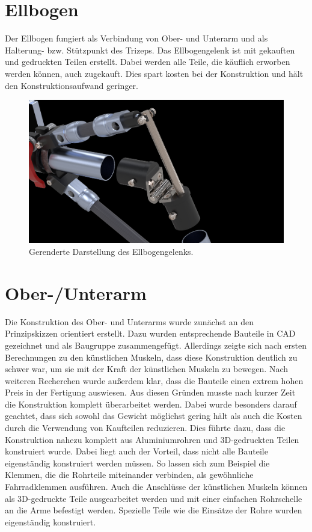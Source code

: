 	\section{Ellbogen}
		Der Ellbogen fungiert als Verbindung von Ober- und Unterarm und als Halterung- bzw. Stützpunkt des Trizeps.
		Das Ellbogengelenk ist mit gekauften und gedruckten Teilen erstellt.
		Dabei werden alle Teile, die käuflich erworben werden können, auch zugekauft.
		Dies spart kosten bei der Konstruktion und hält den Konstruktionsaufwand geringer.
		\begin{figure}[h]
			\centering
			\includegraphics[width=\textwidth]{Abb/CAD/Renderings/ellbogen.jpg}
			\caption[Gerenderte Darstellung des Ellbogengelenks]{Gerenderte Darstellung des Ellbogengelenks.}%
			\label{fig:rendering ellbogen}
		\end{figure}
	
	\section{Ober-/Unterarm}
		Die Konstruktion des Ober- und Unterarms wurde zunächst an den Prinzipskizzen orientiert erstellt.
		Dazu wurden entsprechende Bauteile in CAD gezeichnet und als Baugruppe zusammengefügt.
		Allerdings zeigte sich nach ersten Berechnungen zu den künstlichen Muskeln, dass diese Konstruktion deutlich zu schwer war, um sie mit der Kraft der künstlichen Muskeln zu bewegen.
		Nach weiteren Recherchen wurde außerdem klar, dass die Bauteile einen extrem hohen Preis in der Fertigung auswiesen.
		Aus diesen Gründen musste nach kurzer Zeit die Konstruktion komplett überarbeitet werden.
		Dabei wurde besonders darauf geachtet, dass sich sowohl das Gewicht möglichst gering hält als auch die Kosten durch die Verwendung von Kaufteilen reduzieren.
		Dies führte dazu, dass die Konstruktion nahezu komplett aus Aluminiumrohren und 3D-gedruckten Teilen konstruiert wurde.
		Dabei liegt auch der Vorteil, dass nicht alle Bauteile eigenständig konstruiert werden müssen.
		So lassen sich zum Beispiel die Klemmen, die die Rohrteile miteinander verbinden, als gewöhnliche Fahrradklemmen ausführen.
		Auch die Anschlüsse der künstlichen Muskeln können als 3D-gedruckte Teile ausgearbeitet werden und mit einer einfachen Rohrschelle an die Arme befestigt werden.
		Spezielle Teile wie die Einsätze der Rohre wurden eigenständig konstruiert.

